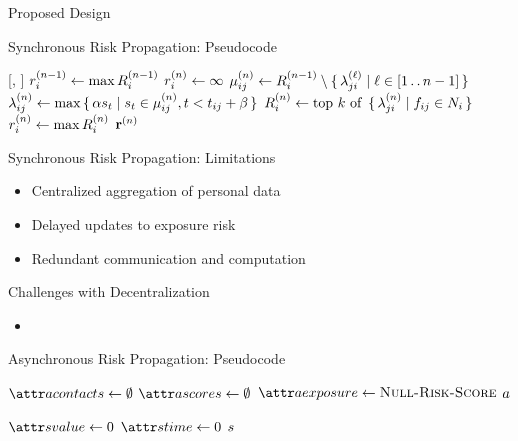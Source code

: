 \documentclass[11pt]{beamer}
\begin{document}
\begin{section}{Proposed Design}
\begin{frame}{Synchronous Risk Propagation: Pseudocode}
\begin{function}{\nRiskPropagation}[\vScores, \vContacts]
  \pause
  \State $r_{i}^{(n - 1)} \leftarrow \max R_{i}^{(n - 1)}$
  \pause
  \State $r_{i}^{(n)} \leftarrow \infty$
  \pause
  \pause
    \State $\mu_{ij}^{(n)} \leftarrow R_{i}^{(n - 1)} \setminus \set{ \lambda_{ji}^{(\ell)} | \ell \in [1 \mathinner{\ldotp \ldotp} n - 1]}$
    \pause
    \State $\lambda_{ij}^{(n)} \leftarrow \max \set{ \alpha s_t| s_t\in \mu_{ij}^{(n)}, t< t_{ij} + \beta}$
    \pause
    \State $\vRiskScores{i}{n} \assign \topK{\setBuilder{\vFactorMessage{j}{i}{n}}{\vFactor[ij] \in \vNeighbors_i}}$
    \pause
    \State $r_{i}^{(n)} \leftarrow \max R_{i}^{(n)}$
    \pause
  \EndWhile
  \State \Return $\mathbf{r}^{(n)}$
\end{function}
\end{frame}

\begin{frame}{Synchronous Risk Propagation: Limitations}
\begin{itemize}
  \item Centralized aggregation of personal data
  \pause
  \item Delayed updates to exposure risk
  \pause
  \item Redundant communication and computation
\end{itemize}
\end{frame}

\begin{frame}{Challenges with Decentralization}
\begin{itemize}
  \item 
\end{itemize}
\end{frame}

\begin{frame}{Asynchronous Risk Propagation: Pseudocode}
\begin{function}{\nCreateActor}
  \State $\aActorContacts \assign \emptyset$
  \pause
  \State $\aActorScores \assign \emptyset$
  \pause
  \State $\aActorExposure \assign \cNullRiskScore$
  \State \Return $a$
\end{function}
\begin{function}{\nNullRiskScore}
  \State $\aScoreValue \assign 0$
  \State $\aScoreTime \assign 0$
  \State \Return $s$
\end{function}
\end{frame}


\end{section}
\end{document}
